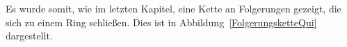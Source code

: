 

Es wurde somit, wie im letzten Kapitel, eine Kette an Folgerungen gezeigt, die
sich zu einem Ring schließen. Dies ist in Abbildung~\ref{FolgerungsketteQui}
dargestellt.

